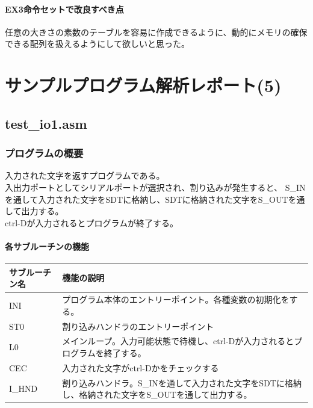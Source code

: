 \documentclass[dvipdfmx,12pt]{jreport}
\begin{document}
\subsubsection{EX3命令セットで改良すべき点}

任意の大きさの素数のテーブルを容易に作成できるように、動的にメモリの確保できる配列を扱えるようにして欲しいと思った。


\chapter*{サンプルプログラム解析レポート(5)}

\section{test\_io1.asm}
\subsection{プログラムの概要}
入力された文字を返すプログラムである。 \\
入出力ポートとしてシリアルポートが選択され、割り込みが発生すると、
S_INを通して入力された文字をSDTに格納し、SDTに格納された文字をS_OUTを通して出力する。 \\
ctrl-Dが入力されるとプログラムが終了する。

\subsubsection{各サブルーチンの機能}

\begin{table}[h]
  \begin{tabular}{|l|p{10cm}|} \hline
    サブルーチン名 & 機能の説明 \\ \hline
    INI & プログラム本体のエントリーポイント。各種変数の初期化をする。 \\ \hline
    ST0 & 割り込みハンドラのエントリーポイント \\ \hline
    L0 & メインループ。入力可能状態で待機し、ctrl-Dが入力されるとプログラムを終了する。 \\ \hline
    CEC & 入力された文字がctrl-Dかをチェックする \\ \hline
    I_HND & 割り込みハンドラ。S_INを通して入力された文字をSDTに格納し、格納された文字をS_OUTを通して出力する。 \\ \hline
  \end{tabular}
\end{table}
\end{document}
